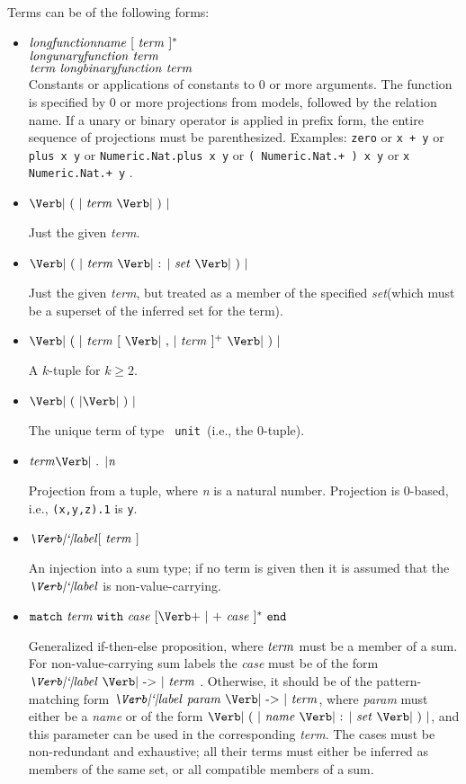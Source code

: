 \documentclass{article}
\newcommand{\keywd}[1]{\mbox{\texttt{#1}}\xspace}
\newcommand{\END}{\keywd{end}}
\newcommand{\MATCH}{\keywd{match}}
\newcommand{\UNIT}{\mbox{\Verb| unit |}}
\newcommand{\WITH}{\keywd{with}}
\newcommand{\metav}[1]{\mbox{\textit{#1}}\xspace}
\newcommand{\Case}{\metav{case}}
\newcommand{\Ident}{\metav{name}}
\newcommand{\Identifier}{\Ident}
\newcommand{\Label}{\metav{\Verb|`|label}}
\newcommand{\Setexp}{\metav{set}}
\newcommand{\Param}{\metav{param}}
\newcommand{\Term}{\metav{term}}
\newcommand{\ARROW}{\mbox{\Verb| -> |}}
\newcommand{\BAR}{\mbox{\Verb+ | +}}
\newcommand{\COLON}{\mbox{\Verb| : |}}
\newcommand{\COMMA}{\mbox{\Verb| , |}}
\newcommand{\LPAREN}{\mbox{\Verb| ( |}}
\newcommand{\RPAREN}{\mbox{\Verb| ) |}}
\newcommand{\PERIOD}{\mbox{\Verb| . |}}
\begin{document}
Terms can be of the following forms:
\begin{itemize}
\item $\metav{longfunctionname}\ [\ \Term\ ]^*$\\
      $\metav{longunaryfunction}\ \Term$\\
      $\Term\ \metav{longbinaryfunction}\ \Term$\\
  
  Constants or applications of constants to 0 or more arguments.  The
  function is specified by 0 or more projections from models, followed
  by the relation name.  If a unary or binary operator is applied in
  prefix form, the entire sequence of projections must be
  parenthesized.  Examples: \Verb|zero| or \Verb|x + y| or 
 \Verb|plus x y| or \Verb|Numeric.Nat.plus x y| or \Verb|( Numeric.Nat.+ ) x y|
  or \Verb|x Numeric.Nat.+ y| .

\item $\LPAREN\ \Term\ \RPAREN$

  Just the given \Term.

\item $\LPAREN\ \Term\ \COLON\ \Setexp\ \RPAREN$

  Just the given \Term, but treated as a member of the specified
  \Setexp (which must be a superset of the inferred set for the term).

\item $\LPAREN\ \Term\ [\ \COMMA\ \Term\ ]^{+}\ \RPAREN$

  A $k$-tuple for $k\ge 2$.

\item $\LPAREN \RPAREN$

  The unique term of type \UNIT (i.e., the 0-tuple).

\item $\Term \PERIOD \metav{n}$
 
  Projection from a tuple, where \metav{n} is a natural number.  Projection
  is 0-based, i.e., \Verb|(x,y,z).1| is \Verb|y|.

\item $\Label [\ \Term\ ]$

  An injection into a sum type; if no term is given then it is
  assumed that the $\Label$ is non-value-carrying.

\item $\MATCH\ \Term\ \WITH\ \Case\ [\BAR\ \Case\ ]^*\ \END$
  
  Generalized if-then-else proposition, where
  $\Term$ must be a member of a sum.  For non-value-carrying
  sum labels the \Case must be of the form  $\Label\ \ARROW\
  \Term$ .  Otherwise, it should be of the pattern-matching
  form $\Label\ \Param\ \ARROW\ \Term$, where \Param must
  either be a \Ident or of the form $\LPAREN\ \Identifier\ \COLON\ 
  \Setexp\ \RPAREN$, and this parameter can be used in the
  corresponding \Term.  The cases must be non-redundant
  and exhaustive; all their terms must either be inferred
  as members of the same set, or all compatible members
  of a sum.
  

\end{itemize}
\end{document}
